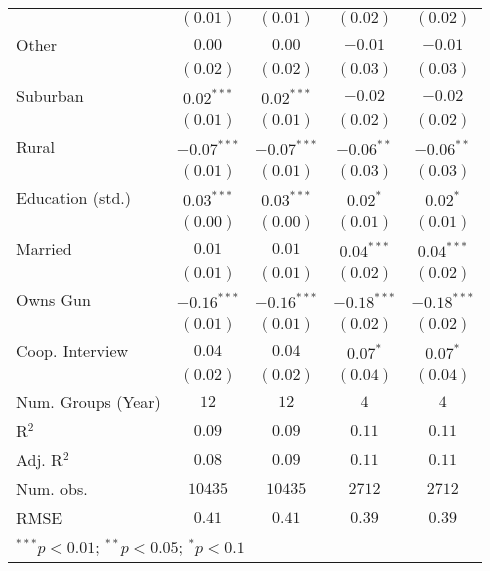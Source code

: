 \begin{table}
\begin{center}
\begin{tabular}{l c c c c}
                        & $(0.01)$      & $(0.01)$      & $(0.02)$      & $(0.02)$      \\
Other                   & $0.00$        & $0.00$        & $-0.01$       & $-0.01$       \\
                        & $(0.02)$      & $(0.02)$      & $(0.03)$      & $(0.03)$      \\
Suburban                & $0.02^{***}$  & $0.02^{***}$  & $-0.02$       & $-0.02$       \\
                        & $(0.01)$      & $(0.01)$      & $(0.02)$      & $(0.02)$      \\
Rural                   & $-0.07^{***}$ & $-0.07^{***}$ & $-0.06^{**}$  & $-0.06^{**}$  \\
                        & $(0.01)$      & $(0.01)$      & $(0.03)$      & $(0.03)$      \\
Education (std.)        & $0.03^{***}$  & $0.03^{***}$  & $0.02^{*}$    & $0.02^{*}$    \\
                        & $(0.00)$      & $(0.00)$      & $(0.01)$      & $(0.01)$      \\
Married                 & $0.01$        & $0.01$        & $0.04^{***}$  & $0.04^{***}$  \\
                        & $(0.01)$      & $(0.01)$      & $(0.02)$      & $(0.02)$      \\
Owns Gun                & $-0.16^{***}$ & $-0.16^{***}$ & $-0.18^{***}$ & $-0.18^{***}$ \\
                        & $(0.01)$      & $(0.01)$      & $(0.02)$      & $(0.02)$      \\
Coop. Interview         & $0.04$        & $0.04$        & $0.07^{*}$    & $0.07^{*}$    \\
                        & $(0.02)$      & $(0.02)$      & $(0.04)$      & $(0.04)$      \\
\midrule
Num. Groups (Year)      & $12$          & $12$          & $4$           & $4$           \\
R$^2$                   & $0.09$        & $0.09$        & $0.11$        & $0.11$        \\
Adj. R$^2$              & $0.08$        & $0.09$        & $0.11$        & $0.11$        \\
Num. obs.               & $10435$       & $10435$       & $2712$        & $2712$        \\
RMSE                    & $0.41$        & $0.41$        & $0.39$        & $0.39$        \\
\bottomrule
\multicolumn{5}{l}{\scriptsize{$^{***}p<0.01$; $^{**}p<0.05$; $^{*}p<0.1$}}
\end{tabular}
\label{table_school_school_uni}
\end{center}
\end{table}

